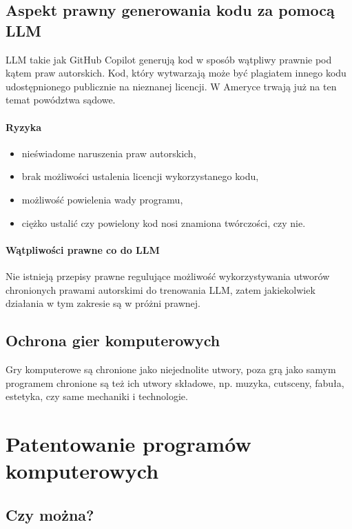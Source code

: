 \documentclass{article}
\begin{document}
\subsection{Aspekt prawny generowania kodu za pomocą LLM}

LLM takie jak GitHub Copilot generują kod w sposób wątpliwy prawnie pod kątem praw autorskich. Kod, który wytwarzają może być plagiatem innego kodu udostępnionego publicznie na nieznanej licencji. W Ameryce trwają już na ten temat powództwa sądowe.

\paragraph{Ryzyka}

\begin{itemize}
  \item nieświadome naruszenia praw autorskich,
  \item brak możliwości ustalenia licencji wykorzystanego kodu,
  \item możliwość powielenia wady programu,
  \item ciężko ustalić czy powielony kod nosi znamiona twórczości, czy nie.
\end{itemize}

\paragraph{Wątpliwości prawne co do LLM}

Nie istnieją przepisy prawne regulujące możliwość wykorzystywania utworów chronionych prawami autorskimi do trenowania LLM, zatem jakiekolwiek działania w tym zakresie są w próżni prawnej.

\subsection{Ochrona gier komputerowych}

Gry komputerowe są chronione jako niejednolite utwory, poza grą jako samym programem chronione są też ich utwory składowe, np. muzyka, cutsceny, fabuła, estetyka, czy same mechaniki i technologie.

\section{Patentowanie programów komputerowych}

\subsection{Czy można?}
\end{document}
